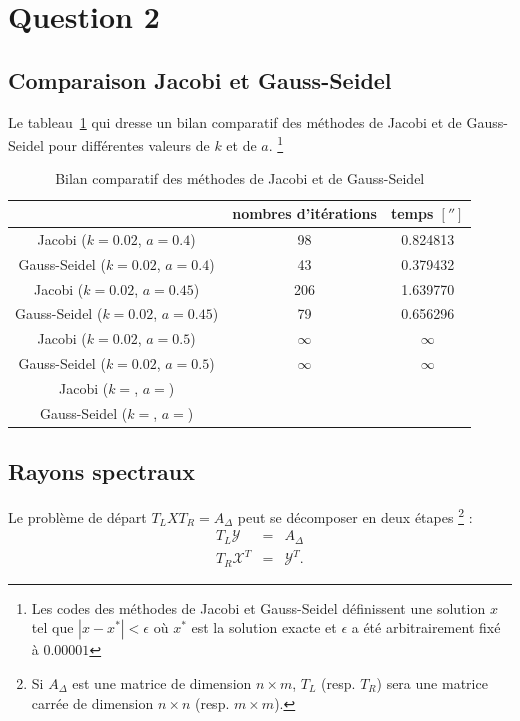 \section{Question 2}
\subsection{Comparaison Jacobi et Gauss-Seidel}
Le tableau~\ref{tab:bench} qui dresse un bilan comparatif des méthodes de Jacobi et de Gauss-Seidel pour différentes valeurs de $k$ et de $a$.
\footnote{Les codes des méthodes de Jacobi et Gauss-Seidel définissent une solution $x$
tel que $|x-x^*|<\epsilon$ où $x^*$ est la solution exacte et $\epsilon$ a été arbitrairement fixé à $0.00001$}

\begin{table}
  \centering
  \begin{tabular}{|c|c|c|}
    \hline
    & nombres d'itérations & temps $[\second]$\\
    \hline
    Jacobi ($k=0.02$, $a=0.4$) &98 &  0.824813\\
    Gauss-Seidel ($k=0.02$, $a=0.4$) &43 & 0.379432 \\
    \hline
    Jacobi ($k=0.02$, $a=0.45$) &206 & 1.639770\\
    Gauss-Seidel ($k=0.02$, $a=0.45$) & 79 & 0.656296 \\
    \hline
    Jacobi ($k=0.02$, $a=0.5$) & $\infty$ & $\infty$\\
    Gauss-Seidel ($k=0.02$, $a=0.5$) & $\infty$ & $\infty$\\
    \hline
    Jacobi ($k=$, $a=$) & & \\
    Gauss-Seidel ($k=$, $a=$) & & \\
    \hline
  \end{tabular}
  \caption{Bilan comparatif des méthodes de Jacobi et de Gauss-Seidel}
  \label{tab:bench}
\end{table}

\subsection{Rayons spectraux}
Le problème de départ $T_L X T_R = A_{\Delta}$ peut se décomposer en deux étapes \footnote{Si $A_{\Delta}$
est une matrice de dimension $n \times m$, $T_L$ (resp. $T_R$) sera une matrice carrée de dimension $n \times n$ (resp. $m \times m$).} :
\begin{eqnarray}
  \label{eq_q2}
  T_L \mathcal{Y} &=& A_{\Delta}\\
  T_R \mathcal{X}^T &=& \mathcal{Y}^T.
\end{eqnarray}

